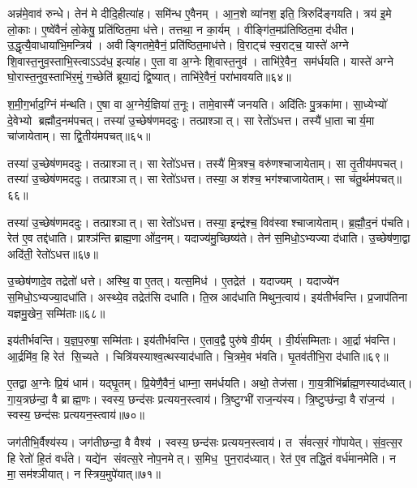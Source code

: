 अन्न॑मे॒वाव॑ रुन्धे।
तेन॑ मे दीदि॒हीत्या॑ह।
समि॑न्ध ए॒वैनम्।
आ॒न॒शे व्या॑नश॒ इति॒ त्रिरुदि॑ङ्गयति।
त्रय॑ इ॒मे लो॒काः।
ए॒ष्वे॑वैनं॑ लो॒केषु॒ प्रति॑ष्ठित॒मा ध॑त्ते।
तत्तथा॒ न का॒र्यम्।
वीङ्गि॑त॒मप्र॑तिष्ठित॒मा द॑धीत।
उ॒द्धृत्यै॒वाधाया॑भि॒मन्त्रिय॑।
अवीङ्गितमे॒वैनं॒ प्रति॑ष्ठित॒माध॑त्ते।
वि॒राट्च॑ स्व॒राट्च॒ यास्ते॑ अग्ने शि॒वास्त॒नुव॒स्ताभि॒स्त्वाऽऽद॑ध॒ इत्या॑ह।
ए॒ता वा अ॒ग्नेः शि॒वास्त॒नुव॑।
ताभि॑रे॒वैन॒ सम॑र्धयति।
यास्ते॑ अग्ने घो॒रास्त॒नुव॒स्ताभि॑र॒मुं ग॒च्छेति॑ ब्रूया॒द्यं द्वि॒ष्यात्।
ताभि॑रे॒वैनं॒ परा॑भावयति॥६४॥\anuvakamend[लो॒को॑ऽसृजतैन॒माध॑त्तेऽन्वाहार्य॒पच॑नं दे॒वाना॒मन्न॑मेनं॒ प्रति॑ष्ठित॒माध॑त्ते॒ पञ्च॑ च]

श॒मी॒ग॒र्भाद॒ग्निं म॑न्थति।
ए॒षा वा अ॒ग्नेर्य॒ज्ञिया॑ त॒नूः।
तामे॒वास्मै॑ जनयति।
अदि॑तिः पु॒त्रका॑मा।
सा॒ध्येभ्यो॑ दे॒वेभ्यो ब्रह्मौद॒नम॑पचत्।
तस्या॑ उ॒च्छेष॑णमददुः।
तत्प्राश्ञात्।
सा रेतो॑ऽधत्त।
तस्यै॑ धा॒ता चार्य॒मा चा॑जायेताम्।
सा द्वि॒तीय॑मपचत्॥६५॥

तस्या॑ उ॒च्छेष॑णमददुः।
तत्प्राश्ञात्।
सा रेतो॑ऽधत्त।
तस्यै॑ मि॒त्रश्च॒ वरु॑णश्चाजायेताम्।
सा तृ॒तीय॑मपचत्।
तस्या॑ उ॒च्छेष॑णमददुः।
तत्प्राश्ञात्।
सा रेतो॑ऽधत्त।
तस्या॒ अश॑श्च॒ भग॑श्चाजायेताम्।
सा च॑तु॒र्थम॑पचत्॥६६॥

तस्या॑ उ॒च्छेष॑णमददुः।
तत्प्राश्ञात्।
सा रेतो॑ऽधत्त।
तस्या॒ इन्द्र॑श्च॒ विव॑स्वाश्चाजायेताम्।
ब्र॒ह्मौ॒द॒नं प॑चति।
रेत॑ ए॒व तद्द॑धाति।
प्राश्ञ॑न्ति ब्राह्म॒णा ओ॑द॒नम्।
यदाज्य॑मु॒च्छिष्य॑ते।
तेन॑ स॒मिधो॒ऽभ्यज्या द॑धाति।
उ॒च्छेष॑णा॒द्वा अदि॑ती॒ रेतो॑ऽधत्त॥६७॥

उ॒च्छेष॑णादे॒व तद्रेतो॑ धत्ते।
अस्थि॒ वा ए॒तत्।
यत्स॒मिध॑।
ए॒तद्रेत॑।
यदाज्यम्।
यदाज्ये॑न स॒मिधो॒ऽभ्यज्या॒दधा॑ति।
अस्थ्ये॒व तद्रेत॑सि दधाति।
ति॒स्र आद॑धाति मिथुन॒त्वाय॑।
इय॑तीर्भवन्ति।
प्र॒जाप॑तिना यज्ञमु॒खेन॒ सम्मि॑ताः॥६८॥

इय॑तीर्भवन्ति।
य॒ज्ञ॒प॒रुषा॒ सम्मि॑ताः।
इय॑तीर्भवन्ति।
ए॒ताव॒द्वै पुरु॑षे वी॒र्यम्।
वी॒र्य॑सम्मिताः।
आ॒र्द्रा भ॑वन्ति।
आ॒र्द्रमि॑व॒ हि रेत॑ सि॒च्यते।
चित्रि॑यस्याश्व॒त्थस्याद॑धाति।
चि॒त्रमे॒व भ॑वति।
घृ॒तव॑तीभि॒रा द॑धाति॥६९॥

ए॒तद्वा अ॒ग्नेः प्रि॒यं धाम॑।
यद्घृ॒तम्।
प्रि॒येणै॒वैनं॒ धाम्ना॒ सम॑र्धयति।
अथो॒ तेज॑सा।
गा॒य॒त्रीभि॑र्ब्राह्म॒णस्याद॑ध्यात्।
गा॒य॒त्रछ॑न्दा॒ वै ब्राह्म॒णः।
स्वस्य॒ छन्द॑सः प्रत्ययन॒स्त्वाय॑।
त्रि॒ष्टुग्भी॑ राज॒न्य॑स्य।
त्रि॒ष्टुप्छ॑न्दा॒ वै रा॑ज॒न्य॑।
स्वस्य॒ छन्द॑सः प्रत्ययन॒स्त्वाय॑॥७०॥

जग॑तीभि॒र्वैश्य॑स्य।
जग॑तीछन्दा॒ वै वैश्य॑।
स्वस्य॒ छन्द॑सः प्रत्ययन॒स्त्वाय॑।
त सं॑वत्स॒रं गो॑पायेत्।
सं॒व॒त्स॒र हि रेतो॑ हि॒तं वर्ध॑ते।
यद्ये॑न संवत्स॒रे नोप॒नमेत्।
स॒मिध॒ पुन॒राद॑ध्यात्।
रेत॑ ए॒व तद्धि॒तं वर्ध॑मानमेति।
न मा॒सम॑श्ञीयात्।
न स्त्रिय॒मुपे॑यात्॥७१॥

